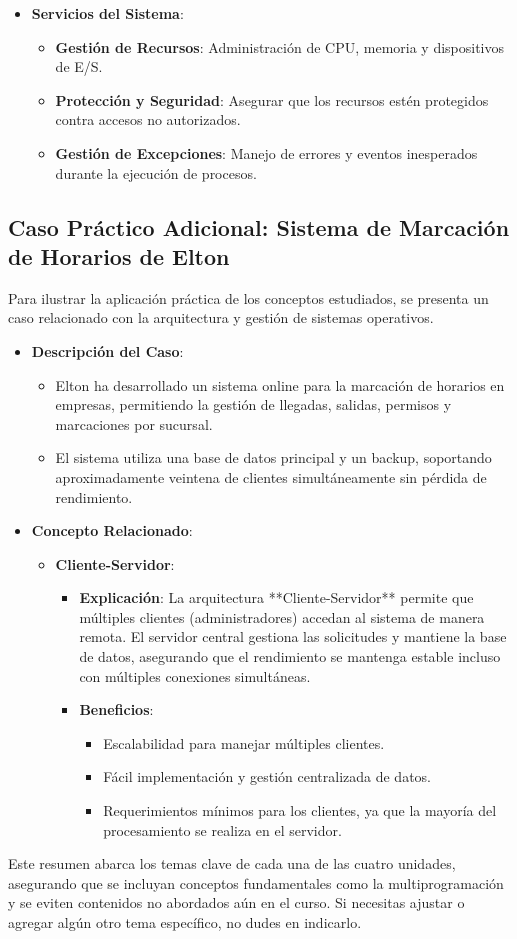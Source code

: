 \begin{itemize}
\begin{itemize}
		\item \textbf{Servicios del Sistema}:
		\begin{itemize}
			\item \textbf{Gestión de Recursos}: Administración de CPU, memoria y dispositivos de E/S.
			\item \textbf{Protección y Seguridad}: Asegurar que los recursos estén protegidos contra accesos no autorizados.
			\item \textbf{Gestión de Excepciones}: Manejo de errores y eventos inesperados durante la ejecución de procesos.
		\end{itemize}
	\end{itemize}
\end{itemize}

\subsection{Caso Práctico Adicional: Sistema de Marcación de Horarios de Elton}
Para ilustrar la aplicación práctica de los conceptos estudiados, se presenta un caso relacionado con la arquitectura y gestión de sistemas operativos.

\begin{itemize}
	\item \textbf{Descripción del Caso}:
	\begin{itemize}
		\item Elton ha desarrollado un sistema online para la marcación de horarios en empresas, permitiendo la gestión de llegadas, salidas, permisos y marcaciones por sucursal.
		\item El sistema utiliza una base de datos principal y un backup, soportando aproximadamente veintena de clientes simultáneamente sin pérdida de rendimiento.
	\end{itemize}
	
	\item \textbf{Concepto Relacionado}:
	\begin{itemize}
		\item \textbf{Cliente-Servidor}:
		\begin{itemize}
			\item \textbf{Explicación}: La arquitectura **Cliente-Servidor** permite que múltiples clientes (administradores) accedan al sistema de manera remota. El servidor central gestiona las solicitudes y mantiene la base de datos, asegurando que el rendimiento se mantenga estable incluso con múltiples conexiones simultáneas.
			\item \textbf{Beneficios}:
			\begin{itemize}
				\item Escalabilidad para manejar múltiples clientes.
				\item Fácil implementación y gestión centralizada de datos.
				\item Requerimientos mínimos para los clientes, ya que la mayoría del procesamiento se realiza en el servidor.
			\end{itemize}
		\end{itemize}
	\end{itemize}
\end{itemize}

Este resumen abarca los temas clave de cada una de las cuatro unidades, asegurando que se incluyan conceptos fundamentales como la multiprogramación y se eviten contenidos no abordados aún en el curso. Si necesitas ajustar o agregar algún otro tema específico, no dudes en indicarlo.
